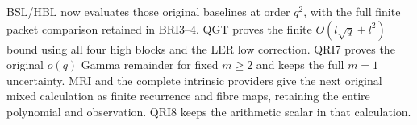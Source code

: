 BSL/HBL now evaluates those original baselines at order $q^2$,
with the full finite packet comparison retained in BRI3--4.
QGT proves the finite $O(l\sqrt q+l^2)$ bound using all four
high blocks and the LER low correction. QRI7 proves the original
$o(q)$ Gamma remainder for fixed $m\ge2$ and keeps the full
$m=1$ uncertainty. MRI and the complete intrinsic providers give
the next original mixed calculation as finite recurrence and fibre
maps, retaining the entire polynomial and observation. QRI8 keeps
the arithmetic scalar in that calculation.